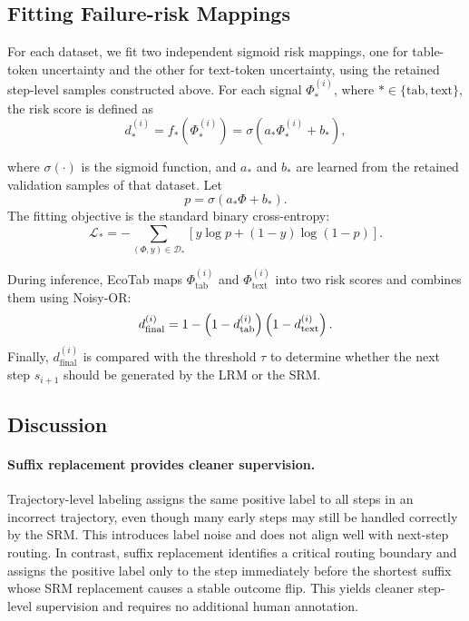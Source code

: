 \documentclass[11pt]{article}
\begin{document}
\vspace{-4pt}

\subsection{Fitting Failure-risk Mappings}
\vspace{-4pt}
For each dataset, we fit two independent sigmoid risk mappings, one for table-token uncertainty and the other for text-token uncertainty, using the retained step-level samples constructed above. For each signal $\Phi_*^{(i)}$, where $* \in \{\text{tab}, \text{text}\}$, the risk score is defined as
\vspace{-3pt}
\begin{equation}
d_*^{(i)} = f_*\!\left(\Phi_*^{(i)}\right) = \sigma\!\left(a_* \Phi_*^{(i)} + b_*\right),
\end{equation}

where $\sigma(\cdot)$ is the sigmoid function, and $a_*$ and $b_*$ are learned from the retained validation samples of that dataset. Let
\vspace{-3pt}
\[
p = \sigma(a_* \Phi + b_*).
\]
The fitting objective is the standard binary cross-entropy:
\begin{equation}
\mathcal{L}_* = -\sum_{(\Phi,y)\in\mathcal{D}_*} \left[ y\log p + (1-y)\log(1-p) \right].
\end{equation}

During inference, EcoTab maps $\Phi_{\text{tab}}^{(i)}$ and $\Phi_{\text{text}}^{(i)}$ into two risk scores and combines them using Noisy-OR:
\vspace{-4pt}
\begin{equation}
d_{\text{final}}^{(i)} = 1-\left(1-d_{\text{tab}}^{(i)}\right)\left(1-d_{\text{text}}^{(i)}\right).
\vspace{-4pt}
\end{equation}
Finally, $d_{\text{final}}^{(i)}$ is compared with the threshold $\tau$ to determine whether the next step $s_{i+1}$ should be generated by the LRM or the SRM.

\vspace{-4pt}

\subsection{Discussion}
\vspace{-3pt}
\paragraph{Suffix replacement provides cleaner supervision.}
Trajectory-level labeling assigns the same positive label to all steps in an incorrect trajectory, even though many early steps may still be handled correctly by the SRM. This introduces label noise and does not align well with next-step routing. In contrast, suffix replacement identifies a critical routing boundary and assigns the positive label only to the step immediately before the shortest suffix whose SRM replacement causes a stable outcome flip. This yields cleaner step-level supervision and requires no additional human annotation.
\end{document}
